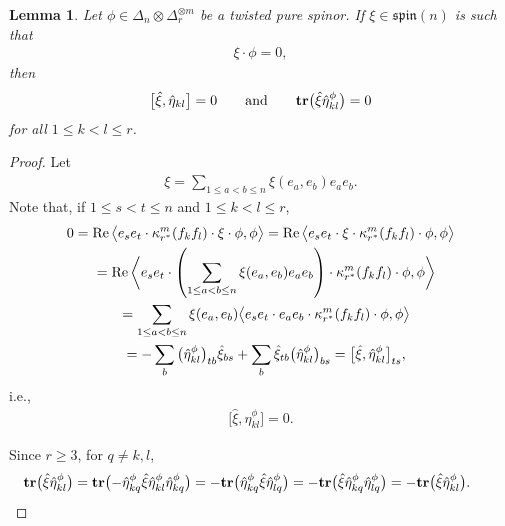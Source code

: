 \documentclass[10pt,a4paper]{amsart}
\newcommand{\tr}{\mbox{\bf tr}}
\numberwithin{equation}{section}
\newtheorem{Lemma}[Theorem]{Lemma}
\begin{document}
\begin{Lemma}\label{lemma: finding stabilizer 1} Let $\phi\in\Delta_n\otimes\Delta_r^{\otimes m}$ be a twisted pure spinor. If $\xi\in\mathfrak{spin}(n)$ is such that
\begin{gather*}\xi\cdot \phi=0,\end{gather*}
then
\begin{gather*}\big[\hat{\xi},\hat{\eta}_{kl}\big]=0\quad\quad\mbox{and}\quad\quad \tr\big(\hat{\xi}\hat{\eta}_{kl}^\phi\big)=0\end{gather*}
for all $1\leq k<l \leq r$.
\end{Lemma}
\begin{proof}
Let
\begin{gather*}\xi=\sum_{1\leq a<b\leq n} \xi(e_a,e_b)e_ae_b.\end{gather*}
Note that, if $1\leq s<t\leq n$ and $1\leq k<l\leq r $,
\begin{gather*}
 0 = \operatorname{Re}\big\langle e_se_t\cdot\kappa_{r^*}^m(f_kf_l)\cdot\xi\cdot\phi,\phi\big\rangle = \operatorname{Re}\big\langle e_se_t\cdot\xi\cdot\kappa_{r^*}^m(f_kf_l)\cdot\phi,\phi\big\rangle \\
 \hphantom{0}{} =
 \operatorname{Re}\bigg\langle e_se_t\cdot\left(\sum_{1\leq a<b\leq n} \xi(e_a,e_b)e_ae_b\right)\cdot\kappa_{r^*}^m(f_kf_l)\cdot\phi,\phi\bigg\rangle \\
\hphantom{0}{} =
 \sum_{1\leq a<b\leq n} \xi(e_a,e_b)\big\langle e_se_t\cdot e_ae_b\cdot\kappa_{r^*}^m(f_kf_l)\cdot\phi,\phi\big\rangle \\
\hphantom{0}{} =
 -\sum_{b} \big(\hat\eta_{kl}^\phi\big)_{tb}\hat\xi_{bs}
 +\sum_{b} \hat\xi_{tb}\big(\hat\eta_{kl}^\phi\big)_{bs}
=
 \big[\hat{\xi},\hat{\eta}_{kl}^\phi\big]_{ts},
\end{gather*}
i.e.,
\begin{gather*}\big[\hat{\xi},\hat{\eta}_{kl}^\phi\big]=0.\end{gather*}

Since $r\geq 3$, for $q\not= k,l$,
\begin{gather*}
 \tr\big(\hat{\xi}\hat{\eta}_{kl}^\phi\big) =
 \tr\big({-}\hat{\eta}_{kq}^\phi\hat{\xi}\hat{\eta}_{kl}^\phi\hat{\eta}_{kq}^\phi\big)
 =
 -\tr\big(\hat{\eta}_{kq}^\phi\hat{\xi}\hat{\eta}_{lq}^\phi\big)
 =
 -\tr\big(\hat{\xi}\hat{\eta}_{kq}^\phi\hat{\eta}_{lq}^\phi\big)
 =
 -\tr\big(\hat{\xi}\hat{\eta}_{kl}^\phi\big).\tag*{\qed}
\end{gather*}\renewcommand{\qed}{}
\end{proof}
\end{document}
